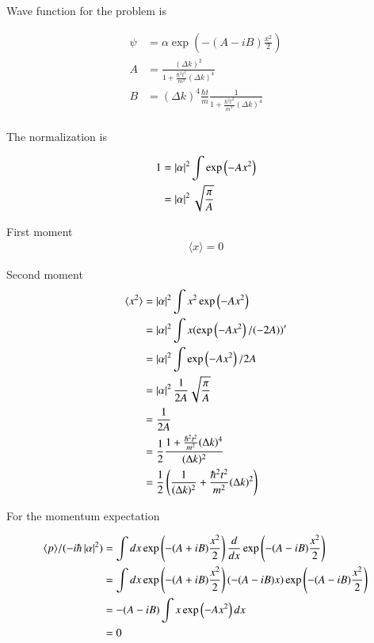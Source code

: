 \documentclass{article}
\newcommand{\expectation}[1]{\langle{#1}\rangle}
\begin{document}
Wave function for the problem is

\begin{align*}
\psi &= \alpha \exp\left( -(A - iB) \frac{x^2}{2} \right) \\
A &= \frac{(\Delta k)^2}{ 1 + \frac{\hbar^2 t^2}{m^2}(\Delta k)^4 } \\
B &= (\Delta k)^4 \frac{\hbar t}{m} \frac{1}{ 1 + \frac{\hbar^2 t^2}{m^2}(\Delta k)^4 } \\
\end{align*}

The normalization is

\begin{align*}
1 
&= \left\lvert{\alpha}\right\rvert^2 \int \exp\left( -A {x^2} \right) \\
&= \left\lvert{\alpha}\right\rvert^2 \sqrt{\frac{\pi}{A}}
\end{align*}

First moment
\begin{align*}
\expectation{x} = 0
\end{align*}

Second moment
\begin{align*}
\expectation{x^2} 
&= 
\Abs{\alpha}^2 \int x^2 \exp\left( -A x^2 \right) \\
&= 
\Abs{\alpha}^2 \int x (\exp\left( -A x^2 \right)/(-2A))' \\
&= 
\Abs{\alpha}^2 \int \exp\left( -A x^2 \right)/2A \\
&= 
\Abs{\alpha}^2 \inv{2A} \sqrt{ \frac{\pi}{A}} \\
&= 
\inv{2A} \\
&=
\inv{2} \frac{ 1 + \frac{\hbar^2 t^2}{m^2}(\Delta k)^4 }{(\Delta k)^2}
 \\
&=
\inv{2}\left(\inv{(\Delta k)^2} + \frac{\hbar^2 t^2}{m^2}(\Delta k)^2 \right) \\
\end{align*}

For the momentum expectation

\begin{align*}
\expectation{p}/(-i\hbar\Abs{\alpha}^2) 
&= \int dx
\exp\left( -(A + iB) \frac{x^2}{2} \right) 
\frac{d}{dx}
\exp\left( -(A - iB) \frac{x^2}{2} \right)  \\
&= \int dx
\exp\left( -(A + iB) \frac{x^2}{2} \right) 
(-(A -iB)x)
\exp\left( -(A - iB) \frac{x^2}{2} \right)  \\
&= 
-(A -iB)
\int x \exp\left( -A x^2 \right) dx
\\
&= 0
\end{align*}
\end{document}
